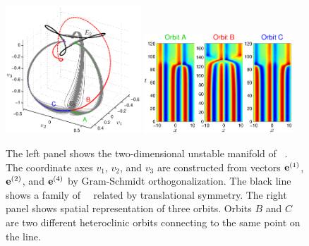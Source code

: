 \begin{figure}[t]
\begin{center}
\includegraphics[width=0.45\textwidth]{figs/ks22_E3_manifold.eps}
\includegraphics[width=0.5\textwidth]{figs/ks22_E3_orbits.eps}
\end{center}
\caption{
The left panel shows the two-dimensional
unstable manifold of \eqv\ . The coordinate axes
$v_1$, $v_2$, and $v_3$ are constructed from vectors
${\mathbf e}^{(1)}$, ${\mathbf e}^{(2)}$, and ${\mathbf e}^{(4)}$ by Gram-Schmidt orthogonalization.
The black line shows a family of ~\eqva\ related by translational
symmetry. The right panel shows spatial representation of
three orbits. Orbits $B$ and $C$ are two different heteroclinic orbits
connecting  to the same point on the  line.
        }
\label{f:KS22E3man}
\end{figure}

